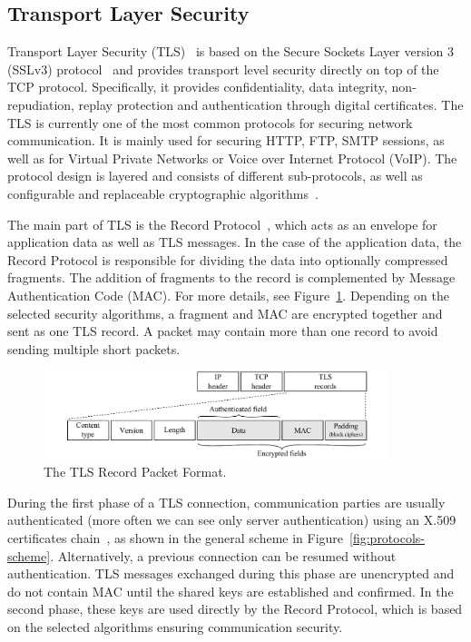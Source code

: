 
\subsection{Transport Layer Security}
Transport Layer Security (TLS)~\cite{rfc5246} is based on the Secure Sockets Layer version 3 (SSLv3) protocol~\cite{rfc6101} and provides transport level security directly on top of the TCP protocol. Specifically, it provides confidentiality, data integrity, non-repudiation, replay protection and authentication through digital certificates. The TLS is currently one of the most common protocols for securing network communication. It is mainly used for securing HTTP, FTP, SMTP sessions, as well as for Virtual Private Networks or Voice over Internet Protocol (VoIP). The protocol design is layered and consists of different sub-protocols, as well as configurable and replaceable cryptographic algorithms~\cite{tls-thesis}.

The main part of TLS is the Record Protocol~\cite{rfc5246}, which acts as an envelope for application data as well as TLS messages. In the case of the application data, the Record Protocol is responsible for dividing the data into optionally compressed fragments. The addition of fragments to the record is complemented by Message Authentication Code (MAC). For more details, see Figure~\ref{fig:tls-record}. Depending on the selected security algorithms, a fragment and MAC are encrypted together and sent as one TLS record. A packet may contain more than one record to avoid sending multiple short packets.

\begin{figure}[!ht]
	\begin{center}
		\includegraphics[width=0.9\textwidth]{figures/tls_record}
		\caption{The TLS Record Packet Format.} 
		\label{fig:tls-record}
	\end{center}
\end{figure}

During the first phase of a TLS connection, communication parties are usually authenticated (more often we can see only server authentication) using an X.509 certificates chain~\cite{rfc5280}, as shown in the general scheme in Figure~\ref{fig:protocols-scheme}. Alternatively, a previous connection can be resumed without authentication. TLS messages exchanged during this phase are unencrypted and do not contain MAC until the shared keys are established and confirmed. In the second phase, these keys are used directly by the Record Protocol, which is based on the selected algorithms ensuring communication security.

